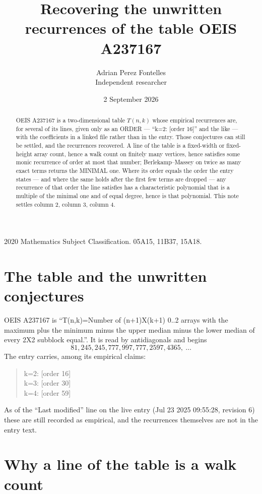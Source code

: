 \documentclass[11pt,a4paper]{article}
\title{Recovering the unwritten recurrences of the table OEIS A237167}
\author{Adrian Perez Fontelles\\ \small Independent researcher}
\date{2 September 2026}
\theoremstyle{plain}
\theoremstyle{definition}
\begin{document}
\maketitle

\begin{abstract}
OEIS A237167 is a two-dimensional table $T(n,k)$ whose empirical recurrences are, for several of
its lines, given only as an ORDER --- ``k=2: [order 16]'' and the like --- with the
coefficients in a linked file rather than in the entry. Those conjectures can still be settled,
and the recurrences recovered. A line of the table is a fixed-width or fixed-height array
count, hence a walk count on finitely many vertices, hence satisfies some monic recurrence of
order at most that number; Berlekamp--Massey on twice as many exact terms returns the MINIMAL
one. Where its order equals the order the entry states --- and where the same holds after the
first few terms are dropped --- any recurrence of that order the line satisfies has a
characteristic polynomial that is a multiple of the minimal one and of equal degree, hence is
that polynomial. This note settles column 2, column 3, column 4.
\end{abstract}

\noindent\small 2020 Mathematics Subject Classification. 05A15, 11B37, 15A18.\normalsize

\section{The table and the unwritten conjectures}

OEIS A237167 is ``T(n,k)=Number of (n+1)X(k+1) 0..2 arrays with the maximum plus the minimum minus the upper median minus the lower median of every 2X2 subblock equal.''. It is read by antidiagonals and begins
\[
81, 245, 245, 777, 997, 777, 2597, 4365,\ \dots
\]
The entry carries, among its empirical claims:
\begin{quote}\small
k=2: [order 16]\\
k=3: [order 30]\\
k=4: [order 59]
\end{quote}
As of the ``Last modified'' line on the live entry (Jul 23 2025 09:55:28, revision 6) these are still
recorded as empirical, and the recurrences themselves are not in the entry text.

\section{Why a line of the table is a walk count}
\end{document}

